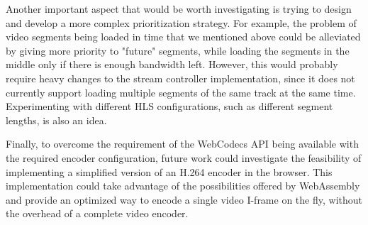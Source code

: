 Another important aspect that would be worth investigating is trying to design and develop a more complex prioritization strategy. For example, the problem of video segments being loaded in time that we mentioned above could be alleviated by giving more priority to "future" segments, while loading the segments in the middle only if there is enough bandwidth left. However, this would probably require heavy changes to the \hlsjs{} stream controller implementation, since it does not currently support loading multiple segments of the same track at the same time. Experimenting with different HLS configurations, such as different segment lengths, is also an idea.

Finally, to overcome the requirement of the WebCodecs API being available with the required encoder configuration, future work could investigate the feasibility of implementing a simplified version of an H.264 encoder in the browser. This implementation could take advantage of the possibilities offered by WebAssembly and provide an optimized way to encode a single video I-frame on the fly, without the overhead of a complete video encoder.

